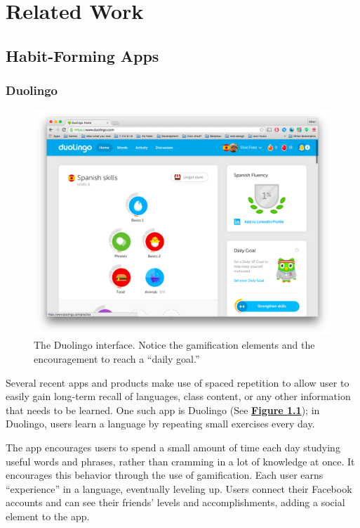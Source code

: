 \chapter{Related Work}

\section{Habit-Forming Apps}
\subsection{Duolingo}

\begin{figure}
	\centerline{\includegraphics[width=1.2\linewidth]{duolingo}}
	\caption{The Duolingo interface. Notice the gamification elements and the encouragement to reach a ``daily goal.''}
	\label{fig:duolingo}
\end{figure}

\par Several recent apps and products make use of spaced repetition to allow user to easily gain long-term recall of languages, class content, or any other information that needs to be learned. One such app is Duolingo (See \textbf{\hyperref[fig:duolingo]{Figure \ref*{fig:duolingo}}}); in Duolingo, users learn a language by repeating small exercises every day. 

\par The app encourages users to spend a small amount of time each day studying useful words and phrases, rather than cramming in a lot of knowledge at once. It encourages this behavior through the use of gamification. Each user earns ``experience'' in a language, eventually leveling up. Users connect their Facebook accounts and can see their friends' levels and accomplishments, adding a social element to the app. %


